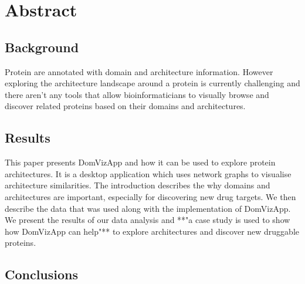 \section*{Abstract}
\setcounter{page}{2}

\subsection*{Background}
% 
% 
% 



Protein are annotated with domain and architecture information. However exploring the architecture landscape around a protein is currently challenging and there aren't any tools that allow bioinformaticians to visually browse and discover related proteins based on their domains and architectures. 

 

\subsection*{Results}
This paper presents DomVizApp and how it can be used to explore protein architectures. It is a desktop application which uses network graphs to visualise architecture similarities. The introduction describes the why domains and architectures are important, especially for discovering new drug targets. We then describe the data that was used along with the implementation of DomVizApp. We present the results of our data analysis and **"a case study is used to show how DomVizApp can help"** to explore architectures and discover new druggable proteins.
\subsection*{Conclusions}
\thispagestyle{empty}

